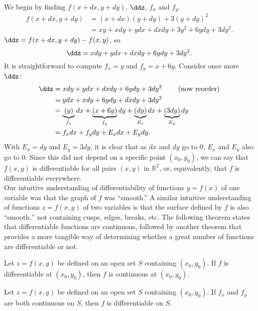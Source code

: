 {We begin by finding $f(x+dx,y+dy)$, $\ddz$, $f_x$ and $f_y$.
\begin{align*}
f(x+dx,y+dy) &= (x+dx)(y+dy) + 3(y+dy)^2 \\
						&= xy + xdy+ydx+dxdy + 3y^2+6ydy+3dy^2.
\end{align*}
$\ddz = f(x+dx,y+dy) - f(x,y)$, so
$$\ddz = xdy + ydx + dxdy + 6ydy+3dy^2.$$
It is straightforward to compute $f_x = y$ and $f_y = x+6y$. Consider once more $\ddz$:
\begin{align*}
\ddz &= xdy + ydx + dxdy + 6ydy+3dy^2 \qquad \text{ (now reorder)}\\
		&= ydx + xdy+6ydy+ dxdy + 3dy^2\\
		&= \underbrace{(y)}_{f_x}dx + \underbrace{(x+6y)}_{f_y}dy + \underbrace{(dy)}_{E_x}dx+\underbrace{(3dy)}_{E_y}dy\\
		&= f_xdx + f_ydy + E_xdx+E_ydy.
\end{align*}
With $E_x = dy$ and $E_y = 3dy$, it is clear that as $dx$ and $ dy$ go to 0, $E_x$ and $E_y$ also go to 0. Since this did not depend on a specific point $(x_0,y_0)$, we can say that $f(x,y)$ is differentiable for all pairs $(x,y)$ in $\mathbb{R}^2$, or, equivalently, that $f$ is differentiable everywhere. 
}\\

Our intuitive understanding of differentiability of functions $y=f(x)$ of one variable was that the graph of $f$ was ``smooth.'' A similar intuitive understanding of functions $z=f(x,y)$ of two variables is that the surface defined by $f$ is also ``smooth,'' not containing cusps, edges, breaks,  etc. The following theorem states that differentiable functions are continuous, followed by another theorem that   provides a
more tangible way of determining whether a great number of functions are differentiable or not.

{Let $z=f(x,y)$ be defined on an open set $S$ containing $(x_0,y_0)$. 
If $f$ is differentiable at $(x_0,y_0)$, then $f$ is continuous at $(x_0,y_0)$.
}

{Let $z=f(x,y)$ be defined on an open set $S$ containing $(x_0,y_0)$. 
If $f_x$ and $f_y$ are both continuous on $S$, then $f$ is differentiable on $S$.
}

